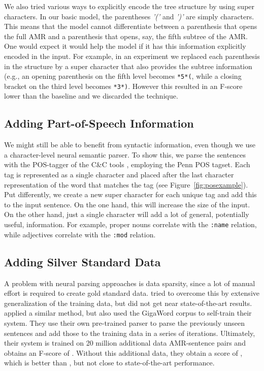 \documentclass[a4paper,10pt,twoside]{article}
\begin{document}
We also tried various ways to explicitly encode the tree structure by using super characters. In our basic model, the parentheses \emph{'('} and \emph{')'} are simply characters. This means that the model cannot differentiate between a parenthesis that opens the full AMR and a parenthesis that opens, say, the fifth subtree of the AMR. One would expect it would help the model if it has this information explicitly encoded in the input. For example, in an experiment we replaced each parenthesis in the structure by a super character that also provides the subtree information (e.g., an opening parenthesis on the fifth level becomes \texttt{*5*(}, while a closing bracket on the third level becomes \texttt{*3*)}. However this resulted in an F-score lower than the baseline and we discarded the technique.

\subsection{Adding Part-of-Speech Information}

We might still be able to benefit from syntactic information, even though we use a character-level neural semantic parser. To show this, we parse the sentences with the POS-tagger of the C\&C tools \cite{clark2003bootstrapping}, employing the Penn POS tagset. Each tag is represented as a single character and placed after the last character representation of the word that matches the tag (see Figure~\ref{fig:posexample}). Put differently, we create a new super character for each unique tag and add this to the input sentence. On the one hand, this will increase the size of the input. On the other hand, just a single character will add a lot of general, potentially useful, information. For example, proper nouns correlate with the \texttt{:name} relation, while adjectives correlate with the \texttt{:mod} relation.

\subsection{Adding Silver Standard Data}

A problem with neural parsing approaches is data sparsity, since a lot of manual effort is required to create gold standard data.  tried to overcome this by extensive generalization of the training data, but did not get near state-of-the-art results.  applied a similar method, but also used the GigaWord corpus to self-train their system. They use their own pre-trained parser to parse the previously unseen sentences and add those to the training data in a series of iterations. Ultimately, their system is trained on 20 million additional data AMR-sentence pairs and obtains an F-score of . Without this additional data, they obtain a score of , which is better than , but not close to state-of-the-art performance. 
\end{document}
